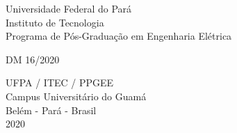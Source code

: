   \begin{capa}
    \center
	\large{Universidade Federal do Par\'a \\ 
	Instituto de Tecnologia\\ 
	Programa de P\'os-Gradua\c{c}\~ao em Engenharia Elétrica}

    \vfill
    {\ABNTEXchapterfont\LARGE\textbf{\imprimirtitulo}}
    \vfill

	{\large\imprimirautor}
	\vfill

    \begin{flushleft}\large DM 16/2020\end{flushleft}
    \vfill
    
	\large{UFPA / ITEC / PPGEE \\
	Campus Universitário do Guamá \\
	Belém - Pará - Brasil \\
	2020}

  \end{capa}
